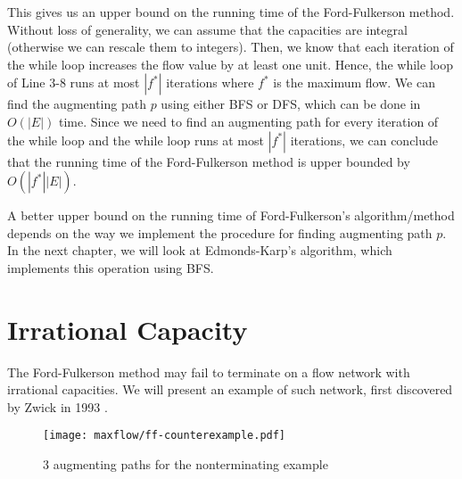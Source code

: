 This gives us an upper bound on the running time of the Ford-Fulkerson method. Without loss of generality, we can assume that the capacities are integral (otherwise we can rescale them to integers). Then, we know that each iteration of the while loop increases the flow value by at least one unit. Hence, the while loop of Line 3-8 runs at most $|f^*|$ iterations where $f^*$ is the maximum flow. We can find the augmenting path $p$ using either BFS or DFS, which can be done in $O(|E|)$ time. Since we need to find an augmenting path for every iteration of the while loop and the while loop runs at most $|f^*|$ iterations, we can conclude that the running time of the Ford-Fulkerson method is upper bounded by $O(|f^*||E|)$. 

A better upper bound on the running time of Ford-Fulkerson's algorithm/method depends on the way we implement the procedure for finding augmenting path $p$. In the next chapter, we will look at Edmonds-Karp's algorithm, which implements this operation using BFS.

\section{Irrational Capacity}

The Ford-Fulkerson method may fail to terminate on a flow network with irrational capacities. We will present an example of such network, first discovered by Zwick in 1993 \cite{Zwick-FF-Example}.

\begin{figure}[htbp]
    \centering
    \texttt{[image: maxflow/ff-counterexample.pdf]}
    \caption{3 augmenting paths for the nonterminating example}
    \label{fig:ff-counterexample-augment-path}
\end{figure}
